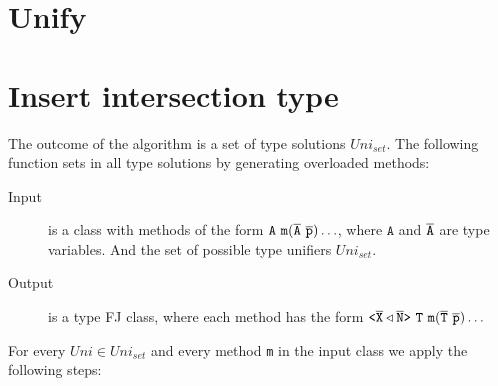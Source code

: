 \documentclass[a4paper,USenglish,cleveref, autoref, thm-restate]{lipics-v2021}
\begin{document}
\section{Unify}
\label{sec:unify-1}




\section{Insert intersection type}
\label{sec:insert-inters-type}

The outcome of the \unify{} algorithm is a set of type solutions $Uni_{set}$.
The following function sets in all type solutions by generating overloaded methods:

\begin{description}
\item[Input] is a class with methods of the form%
$\mathtt{A\ m(\overline{\tt A}\ \overline{\tt p})\ldots}$, where $\mathtt{A}$ and $\mathtt{\overline{\tt A}}$ are type variables.
And the set of possible type unifiers $Uni_{set}$.
\item[Output] is a type FJ class, where each method has the form
$\mathtt{\exptype{}{\ol{X} \triangleleft \ol{N}}\ T\ m(\ol{T}\ \ol{p})\ldots}$
\end{description}


For every $Uni \in Uni_{set}$ and every method \texttt{m} in the input class we apply the following steps:
\end{document}
